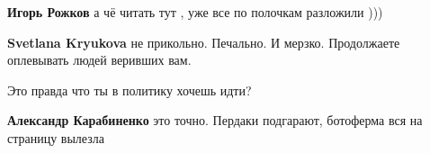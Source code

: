 \begin{itemize}
\begin{itemize}
\textbf{Игорь Рожков} а чё читать тут , уже все по полочкам разложили )))

 
\textbf{Svetlana Kryukova} не прикольно. Печально. И мерзко. Продолжаете оплевывать людей веривших вам.

 
Это правда что ты в политику хочешь идти?

 
\textbf{Александр Карабиненко} это точно. Пердаки подгарают, ботоферма вся на страницу вылезла \Smiley[1.0][yellow]


\end{itemize}

\end{itemize}

